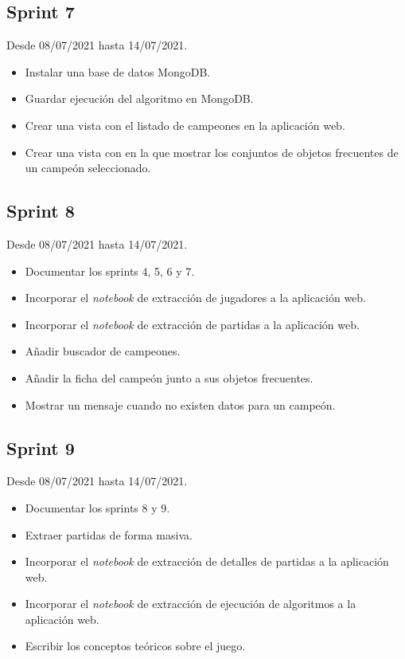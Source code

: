 \subsection{Sprint 7}

Desde 08/07/2021 hasta 14/07/2021.

\begin{itemize}
    \item Instalar una base de datos MongoDB.
    \item Guardar ejecución del algoritmo en MongoDB.
    \item Crear una vista con el listado de campeones en la aplicación web.
    \item Crear una vista con en la que mostrar los conjuntos de objetos frecuentes de un campeón seleccionado.
\end{itemize}

\subsection{Sprint 8}

Desde 08/07/2021 hasta 14/07/2021.

\begin{itemize}
    \item Documentar los sprints 4, 5, 6 y 7.
    \item Incorporar el \textit{notebook} de extracción de jugadores a la aplicación web.
 	\item Incorporar el \textit{notebook} de extracción de partidas a la aplicación web.
 	\item Añadir buscador de campeones.
 	\item Añadir la ficha del campeón junto a sus objetos frecuentes.
 	\item Mostrar un mensaje cuando no existen datos para un campeón.
\end{itemize}

\subsection{Sprint 9}

Desde 08/07/2021 hasta 14/07/2021.

\begin{itemize}
	\item Documentar los sprints 8 y 9.
	\item Extraer partidas de forma masiva.
    \item Incorporar el \textit{notebook} de extracción de detalles de partidas a la aplicación web.
    \item Incorporar el \textit{notebook} de extracción de ejecución de algoritmos a la aplicación web.
    \item Escribir los conceptos teóricos sobre el juego.
\end{itemize}

